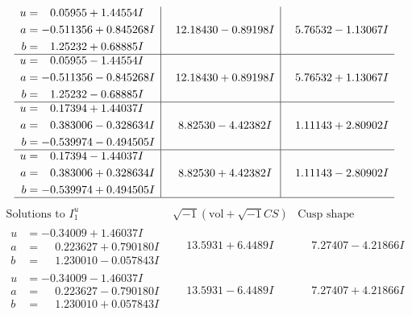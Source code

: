 \documentclass[1p]{elsarticle_modified}
\theoremstyle{definition}
\newcommand{\I}{\sqrt{-1}}
\begin{document}
$$\begin{array}{c|c|c}
\begin{aligned}
u &= \phantom{-}0.05955 + 1.44554 I \\
a &= -0.511356 + 0.845268 I \\
b &= \phantom{-}1.25232 + 0.68885 I\end{aligned}
 & \phantom{-}12.18430 - 0.89198 I & \phantom{-}5.76532 - 1.13067 I \\ \hline\begin{aligned}
u &= \phantom{-}0.05955 - 1.44554 I \\
a &= -0.511356 - 0.845268 I \\
b &= \phantom{-}1.25232 - 0.68885 I\end{aligned}
 & \phantom{-}12.18430 + 0.89198 I & \phantom{-}5.76532 + 1.13067 I \\ \hline\begin{aligned}
u &= \phantom{-}0.17394 + 1.44037 I \\
a &= \phantom{-}0.383006 - 0.328634 I \\
b &= -0.539974 - 0.494505 I\end{aligned}
 & \phantom{-}8.82530 - 4.42382 I & \phantom{-}1.11143 + 2.80902 I \\ \hline\begin{aligned}
u &= \phantom{-}0.17394 - 1.44037 I \\
a &= \phantom{-}0.383006 + 0.328634 I \\
b &= -0.539974 + 0.494505 I\end{aligned}
 & \phantom{-}8.82530 + 4.42382 I & \phantom{-}1.11143 - 2.80902 I\\
 \hline 
 \end{array}$$\newpage$$\begin{array}{c|c|c}  
\text{Solutions to }I^u_{1}& \I (\text{vol} + \sqrt{-1}CS) & \text{Cusp shape}\\
 \hline 
\begin{aligned}
u &= -0.34009 + 1.46037 I \\
a &= \phantom{-}0.223627 + 0.790180 I \\
b &= \phantom{-}1.230010 - 0.057843 I\end{aligned}
 & \phantom{-}13.5931 + 6.4489 I & \phantom{-}7.27407 - 4.21866 I \\ \hline\begin{aligned}
u &= -0.34009 - 1.46037 I \\
a &= \phantom{-}0.223627 - 0.790180 I \\
b &= \phantom{-}1.230010 + 0.057843 I\end{aligned}
 & \phantom{-}13.5931 - 6.4489 I & \phantom{-}7.27407 + 4.21866 I \\ \hline\begin{aligned}

\end{aligned}
\end{array}$$
\end{document}
